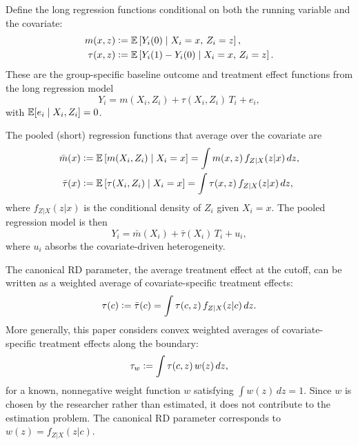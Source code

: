 Define the long regression functions conditional on both the running variable and the covariate:
\begin{align}
	m(x,z) &\vcentcolon= \operatorname{\mathbb{E}}\left[Y_i(0) \mid X_i = x,\, Z_i = z\right],\\
	\tau(x,z) &\vcentcolon= \operatorname{\mathbb{E}}\left[Y_i(1) - Y_i(0) \mid X_i = x,\, Z_i = z\right].
\end{align}
These are the group-specific baseline outcome and treatment effect functions from the long regression model
\begin{equation}\label{eq:long_regression}
	Y_i = m(X_i, Z_i) + \tau(X_i, Z_i)\, T_i + e_i,
\end{equation}
with $\operatorname{\mathbb{E}}[e_i \mid X_i, Z_i] = 0$.

The pooled (short) regression functions that average over the covariate are
\begin{align}
	\bar{m}(x) &\vcentcolon= \operatorname{\mathbb{E}}\left[m(X_i, Z_i) \mid X_i = x\right] = \int m(x,z)\, f_{Z|X}(z|x)\, dz,\\
	\bar{\tau}(x) &\vcentcolon= \operatorname{\mathbb{E}}\left[\tau(X_i, Z_i) \mid X_i = x\right] = \int \tau(x,z)\, f_{Z|X}(z|x)\, dz,
\end{align}
where $f_{Z|X}(z|x)$ is the conditional density of $Z_i$ given $X_i = x$.
The pooled regression model is then
\begin{equation}\label{eq:pooled_regression}
	Y_i = \bar{m}(X_i) + \bar{\tau}(X_i)\, T_i + u_i,
\end{equation}
where $u_i$ absorbs the covariate-driven heterogeneity.

The canonical RD parameter, the average treatment effect at the cutoff, can be written as a weighted average of covariate-specific treatment effects:
\begin{equation}\label{eq:tau_rd}
	\tau(c) \vcentcolon= \bar{\tau}(c) = \int \tau(c,z)\, f_{Z|X}(z|c)\, dz.
\end{equation}
More generally, this paper considers convex weighted averages of covariate-specific treatment effects along the boundary:
\begin{equation}\label{eq:tau_w}
	\tau_w \vcentcolon= \int \tau(c,z)\, w(z)\, dz,
\end{equation}
for a known, nonnegative weight function $w$ satisfying $\int w(z)\, dz = 1$.
Since $w$ is chosen by the researcher rather than estimated, it does not contribute to the estimation problem.
The canonical RD parameter corresponds to $w(z) = f_{Z|X}(z|c)$.

